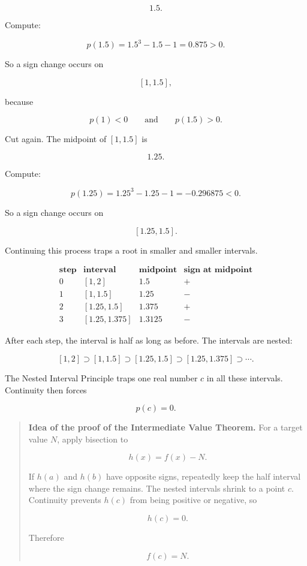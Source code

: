 \[
1.5.
\]

Compute:

\[
p(1.5)=1.5^3-1.5-1=0.875>0.
\]

So a sign change occurs on

\[
[1,1.5],
\]

because

\[
p(1)<0
\qquad\text{and}\qquad
p(1.5)>0.
\]

Cut again.  The midpoint of \([1,1.5]\) is

\[
1.25.
\]

Compute:

\[
p(1.25)=1.25^3-1.25-1=-0.296875<0.
\]

So a sign change occurs on

\[
[1.25,1.5].
\]

Continuing this process traps a root in smaller and smaller intervals.

\[
\begin{array}{c|c|c|c}
\textbf{step} & \textbf{interval} & \textbf{midpoint} & \textbf{sign at midpoint} \\ \hline
0 & [1,2] & 1.5 & + \\[2pt]
1 & [1,1.5] & 1.25 & - \\[2pt]
2 & [1.25,1.5] & 1.375 & + \\[2pt]
3 & [1.25,1.375] & 1.3125 & -
\end{array}
\]

After each step, the interval is half as long as before.  The intervals are nested:

\[
[1,2]\supset[1,1.5]\supset[1.25,1.5]\supset[1.25,1.375]\supset\cdots.
\]

The Nested Interval Principle traps one real number \(c\) in all these intervals.  Continuity then forces

\[
p(c)=0.
\]

\begin{quote}
\textbf{Idea of the proof of the Intermediate Value Theorem.}
For a target value \(N\), apply bisection to

\[
h(x)=f(x)-N.
\]

If \(h(a)\) and \(h(b)\) have opposite signs, repeatedly keep the half interval where the sign change remains.  The nested intervals shrink to a point \(c\).  Continuity prevents \(h(c)\) from being positive or negative, so

\[
h(c)=0.
\]

Therefore

\[
f(c)=N.
\]
\end{quote}

